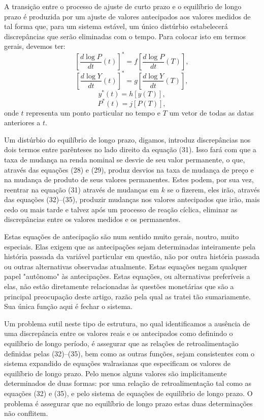 \documentclass[12pt]{article}
\begin{document}
A transição entre o processo de ajuste de curto prazo e o equilíbrio de longo prazo é produzida por um ajuste de valores antecipados aos valores medidos de tal forma que, para um sistema estável, um único distúrbio estabelecerá discrepâncias que serão eliminadas com o tempo. Para colocar isto em termos gerais, devemos ter:
\begin{equation}
\left[ \frac{d \log P}{dt} (t) \right]^* = f\left[ \frac{d \log P}{dt} (T) \right],
\end{equation}
\begin{equation}
\left[ \frac{d \log Y}{dt} (t) \right]^* = g\left[ \frac{d \log Y}{dt} (T) \right],
\end{equation}
\begin{equation}
y^*(t) = h[y(T)],
\end{equation}
\begin{equation}
P^*(t) = j[P(T)],
\end{equation}
onde $t$ representa um ponto particular no tempo e $T$ um vetor de todas as datas anteriores a $t$.

Um distúrbio do equilíbrio de longo prazo, digamos, introduz discrepâncias nos dois termos entre parênteses no lado direito da equação (31). Isso fará com que a taxa de mudança na renda nominal se desvie de seu valor permanente, o que, através das equações (28) e (29), produz desvios na taxa de mudança de preço e na mudança de produto de seus valores permanentes. Estes podem, por sua vez, reentrar na equação (31) através de mudanças em $k$ se o fizerem, eles irão, através das equações (32)–(35), produzir mudanças nos valores antecipados que irão, mais cedo ou mais tarde e talvez após um processo de reação cíclica, eliminar as discrepâncias entre os valores medidos e os permanentes.

Estas equações de antecipação são num sentido muito gerais, noutro, muito especiais. Elas exigem que as antecipações sejam determinadas inteiramente pela história passada da variável particular em questão, não por outra história passada ou outras alternativas observadas atualmente. Estas equações negam qualquer papel "autônomo" às antecipações. Estas equações, ou alternativas preferíveis a elas, não estão diretamente relacionadas às questões monetárias que são a principal preocupação deste artigo, razão pela qual as tratei tão sumariamente. Sua única função aqui é fechar o sistema.

Um problema sutil neste tipo de estrutura, no qual identificamos a ausência de uma discrepância entre os valores reais e os antecipados como definindo o equilíbrio de longo período, é assegurar que as relações de retroalimentação definidas pelas (32)–(35), bem como as outras funções, sejam consistentes com o sistema expandido de equações walrasianas que especificam os valores de equilíbrio de longo prazo. Pelo menos alguns valores são implicitamente determinados de duas formas: por uma relação de retroalimentação tal como as equações (32) e (35), e pelo sistema de equações de equilíbrio de longo prazo. O problema é assegurar que no equilíbrio de longo prazo estas duas determinações não conflitem.
\end{document}
